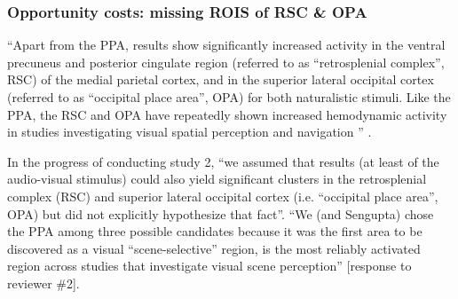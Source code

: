 




\subsubsection{Opportunity costs: missing ROIS of RSC \& OPA}



%
``Apart from the PPA, results show significantly increased activity in the
ventral precuneus and posterior cingulate region (referred to as ``retrosplenial
complex'', RSC) of the medial parietal cortex, and in the superior lateral
occipital cortex (referred to as ``occipital place area'', OPA) for both
naturalistic stimuli.
Like the PPA, the RSC and OPA have repeatedly shown increased hemodynamic
activity in studies investigating visual spatial perception and navigation
\citep{chrastil2018heterogeneity, bettencourt2013role, dilks2013occipital,
epstein2019scene}'' \citep{haeusler2022processing}.

%
In the progress of conducting study 2, ``we assumed that results (at least of
the audio-visual stimulus) could also yield significant clusters in the
retrosplenial complex (RSC) and superior lateral occipital cortex (i.e.
“occipital place area”, OPA) but did not explicitly hypothesize that fact''.
%
``We (and Sengupta) chose the PPA among three possible candidates
because it was the first area to be discovered as a visual ``scene-selective''
region, is the most reliably activated region across studies that investigate
visual scene perception'' [response to reviewer \#2].

